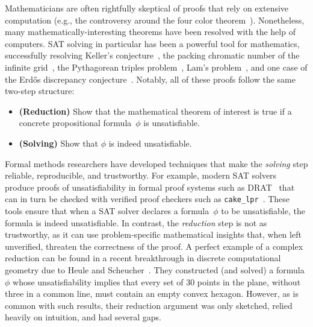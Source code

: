 Mathematicians are often rightfully skeptical of proofs that rely on extensive computation (e.g., the controversy around the four color theorem~\cite{Walters2004ItAT}).
Nonetheless, many mathematically-interesting theorems have been resolved with the help of computers.
SAT solving in particular has been a powerful tool for mathematics, successfully resolving
Keller's conjecture~\cite{brakensiek2023resolution},
the packing chromatic number of the infinite grid~\cite{Subercaseaux_Heule_2023},
the Pythagorean triples problem~\cite{Heule_2016},
Lam's problem~\cite{21bright_sat_based_resolution_lams_problem},
and one case of the Erd\H{o}s discrepancy conjecture~\cite{konev2014sat}.
Notably, all of these proofs follow the same two-step structure:
\begin{itemize}
\item \textbf{(Reduction)} Show that the mathematical theorem of interest is true if a concrete propositional formula~$\phi$ is unsatisfiable.
\item \textbf{(Solving)} Show that $\phi$ is indeed unsatisfiable.
\end{itemize}


Formal methods researchers have developed techniques that make the \emph{solving} step reliable, reproducible, and trustworthy.
For example,
modern SAT solvers produce proofs of unsatisfiability in formal proof systems
such as DRAT~\cite{drat-trim14}
that can in turn be checked with verified proof checkers
such as \texttt{cake\_lpr}~\cite{tanVerifiedPropagationRedundancy2023}.
These tools ensure that when a SAT solver declares a formula~$\phi$ to be unsatisfiable, the formula is indeed unsatisfiable.
In contrast, the \emph{reduction} step is not as trustworthy,
as it can use problem-specific mathematical insights that, when left unverified, threaten the correctness of the proof.
A perfect example of a complex reduction can be found in a recent breakthrough in discrete computational geometry due to Heule and Scheucher~\cite{emptyHexagonNumber}.
They constructed (and solved) a formula $\phi$ whose unsatisfiability implies that every set of 30 points in the plane, without three in a common line, must contain an empty convex hexagon.
However, as is common with such results, their reduction argument was only sketched, relied heavily on intuition,
and had several gaps.


